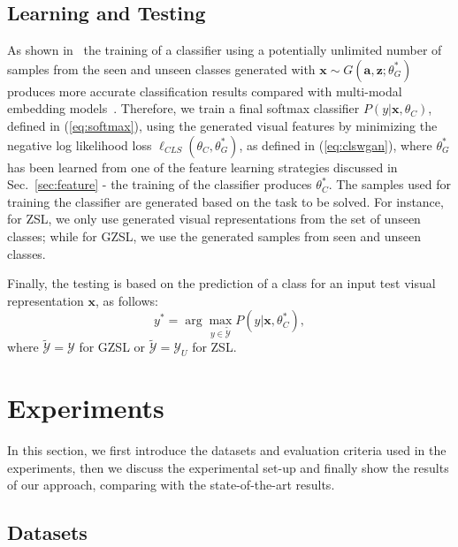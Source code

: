 \documentclass[runningheads]{llncs}
\begin{document}
\subsection{Learning and Testing}
\label{sec:classifier}

As shown in~\cite{XianCVPR2018} the training of a classifier using a potentially unlimited number of samples from the seen and unseen classes generated with $\mathbf{x} \sim G(\mathbf{a},\mathbf{z};\theta_G^*)$ produces more accurate classification results compared with multi-modal embedding models~\cite{akata2016label,frome2013devise,akata2015evaluation,romera2015embarrassingly}.  Therefore, we train a final softmax classifier $P(y|\mathbf{x},\theta_C)$, defined in (\ref{eq:softmax}), using the generated visual features by minimizing the negative log likelihood loss $\ell_{CLS}(\theta_C,\theta^*_G)$, as defined in (\ref{eq:clswgan}), where $\theta_G^*$ has been learned from one of the feature learning strategies discussed in Sec.~\ref{sec:feature} - the training of the classifier produces $\theta^*_C$. The samples used for training the classifier are generated based on the task to be solved.  For instance, for ZSL, we only use generated visual representations from the set of unseen classes; while for GZSL, we use the generated samples from seen and unseen classes.

Finally, the testing is based on the prediction of a class for an input test visual representation $\mathbf{x}$, as follows:
\begin{equation}
y^* = \arg \max_{y \in \widetilde{\mathcal{Y}}} P(y|\mathbf{x},\theta^*_C),
\end{equation}
where $\widetilde{\mathcal{Y}} = \mathcal{Y}$ for GZSL or $\widetilde{\mathcal{Y}} = \mathcal{Y}_U$ for ZSL.

\section{Experiments}
\label{sec:experiments}

In this section, we first introduce the datasets and evaluation criteria used in the experiments, then we  discuss the experimental set-up and finally show the results of our approach, comparing with the state-of-the-art results.

\subsection{Datasets} 
\label{sec:datasets}
\end{document}
